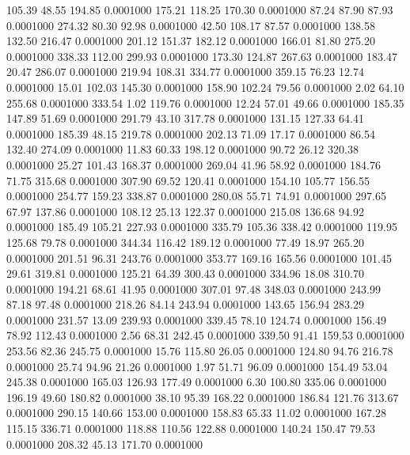  105.39   48.55  194.85   0.0001000
 175.21  118.25  170.30   0.0001000
  87.24   87.90   87.93   0.0001000
 274.32   80.30   92.98   0.0001000
  42.50  108.17   87.57   0.0001000
 138.58  132.50  216.47   0.0001000
 201.12  151.37  182.12   0.0001000
 166.01   81.80  275.20   0.0001000
 338.33  112.00  299.93   0.0001000
 173.30  124.87  267.63   0.0001000
 183.47   20.47  286.07   0.0001000
 219.94  108.31  334.77   0.0001000
 359.15   76.23   12.74   0.0001000
  15.01  102.03  145.30   0.0001000
 158.90  102.24   79.56   0.0001000
   2.02   64.10  255.68   0.0001000
 333.54    1.02  119.76   0.0001000
  12.24   57.01   49.66   0.0001000
 185.35  147.89   51.69   0.0001000
 291.79   43.10  317.78   0.0001000
 131.15  127.33   64.41   0.0001000
 185.39   48.15  219.78   0.0001000
 202.13   71.09   17.17   0.0001000
  86.54  132.40  274.09   0.0001000
  11.83   60.33  198.12   0.0001000
  90.72   26.12  320.38   0.0001000
  25.27  101.43  168.37   0.0001000
 269.04   41.96   58.92   0.0001000
 184.76   71.75  315.68   0.0001000
 307.90   69.52  120.41   0.0001000
 154.10  105.77  156.55   0.0001000
 254.77  159.23  338.87   0.0001000
 280.08   55.71   74.91   0.0001000
 297.65   67.97  137.86   0.0001000
 108.12   25.13  122.37   0.0001000
 215.08  136.68   94.92   0.0001000
 185.49  105.21  227.93   0.0001000
 335.79  105.36  338.42   0.0001000
 119.95  125.68   79.78   0.0001000
 344.34  116.42  189.12   0.0001000
  77.49   18.97  265.20   0.0001000
 201.51   96.31  243.76   0.0001000
 353.77  169.16  165.56   0.0001000
 101.45   29.61  319.81   0.0001000
 125.21   64.39  300.43   0.0001000
 334.96   18.08  310.70   0.0001000
 194.21   68.61   41.95   0.0001000
 307.01   97.48  348.03   0.0001000
 243.99   87.18   97.48   0.0001000
 218.26   84.14  243.94   0.0001000
 143.65  156.94  283.29   0.0001000
 231.57   13.09  239.93   0.0001000
 339.45   78.10  124.74   0.0001000
 156.49   78.92  112.43   0.0001000
   2.56   68.31  242.45   0.0001000
 339.50   91.41  159.53   0.0001000
 253.56   82.36  245.75   0.0001000
  15.76  115.80   26.05   0.0001000
 124.80   94.76  216.78   0.0001000
  25.74   94.96   21.26   0.0001000
   1.97   51.71   96.09   0.0001000
 154.49   53.04  245.38   0.0001000
 165.03  126.93  177.49   0.0001000
   6.30  100.80  335.06   0.0001000
 196.19   49.60  180.82   0.0001000
  38.10   95.39  168.22   0.0001000
 186.84  121.76  313.67   0.0001000
 290.15  140.66  153.00   0.0001000
 158.83   65.33   11.02   0.0001000
 167.28  115.15  336.71   0.0001000
 118.88  110.56  122.88   0.0001000
 140.24  150.47   79.53   0.0001000
 208.32   45.13  171.70   0.0001000
